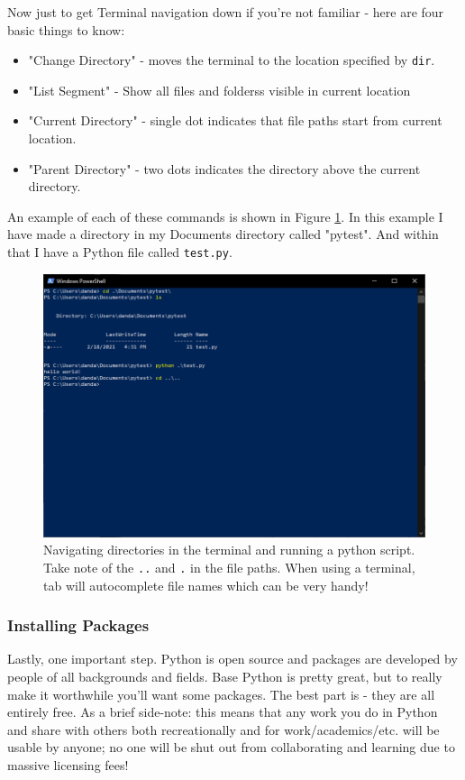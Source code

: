 \documentclass[oneside]{book}
\begin{document}
Now just to get Terminal navigation down if you're not familiar - here are four basic things to know:

\begin{itemize}
	\item{ "Change Directory" - moves the terminal to the location specified by \texttt{dir}.}
	\item{ "List Segment" - Show all files and folderss visible in current location}
	\item{ "Current Directory" - single dot indicates that file paths start from current location.}
	\item{ "Parent Directory" - two dots indicates the directory above the current directory.}
\end{itemize}

An example of each of these commands is shown in Figure \ref{fig:pytest}. In this example I have made a directory in my Documents directory called "pytest". And within that I have a Python file called \texttt{test.py}. 

\begin{figure}[H]
\centering
\includegraphics[width=0.7\linewidth]{./img/pytest.PNG}
\caption{Navigating directories in the terminal and running a python script. Take note of the \texttt{..} and \texttt{.} in the file paths. When using a terminal, tab will autocomplete file names which can be very handy!}
\label{fig:pytest}
\end{figure}

\subsubsection{Installing Packages}

Lastly, one important step. Python is open source and packages are developed by people of all backgrounds and fields. Base Python is pretty great, but to really make it worthwhile you'll want some packages. The best part is - they are all entirely free. As a brief side-note: this means that any work you do in Python and share with others both recreationally and for work/academics/etc. will be usable by anyone; no one will be shut out from collaborating and learning due to massive licensing fees!
\end{document}
